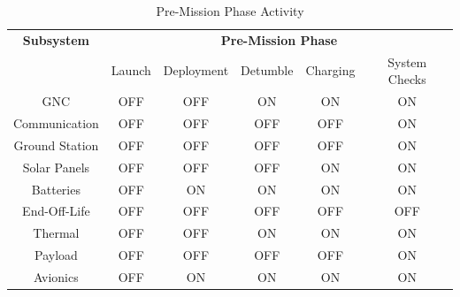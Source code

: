 \begin{table}[htbp]
  \centering
  \caption{Pre-Mission Phase Activity}
    \begin{tabular}{|c|c|c|c|c|c|}
    \hline
    \textbf{Subsystem} & \multicolumn{5}{c|}{\textbf{Pre-Mission Phase}} \\
          & \multicolumn{1}{c}{Launch} & \multicolumn{1}{c}{Deployment} & \multicolumn{1}{c}{Detumble} & \multicolumn{1}{c}{Charging} & System Checks \\
    GNC   & \cellcolor[rgb]{ .753,  0,  0}OFF & \cellcolor[rgb]{ .753,  0,  0}OFF & \cellcolor[rgb]{ .573,  .816,  .314}ON & \cellcolor[rgb]{ .573,  .816,  .314}ON & \cellcolor[rgb]{ .573,  .816,  .314}ON \\
    Communication & \cellcolor[rgb]{ .753,  0,  0}OFF & \cellcolor[rgb]{ .753,  0,  0}OFF & \cellcolor[rgb]{ .753,  0,  0}OFF & \cellcolor[rgb]{ .753,  0,  0}OFF & \cellcolor[rgb]{ .573,  .816,  .314}ON \\
    Ground Station & \cellcolor[rgb]{ .753,  0,  0}OFF & \cellcolor[rgb]{ .753,  0,  0}OFF & \cellcolor[rgb]{ .753,  0,  0}OFF & \cellcolor[rgb]{ .753,  0,  0}OFF & \cellcolor[rgb]{ .573,  .816,  .314}ON \\
    Solar Panels  & \cellcolor[rgb]{ .753,  0,  0}OFF & \cellcolor[rgb]{ .753,  0,  0}OFF & \cellcolor[rgb]{ .753,  0,  0}OFF & \cellcolor[rgb]{ .573,  .816,  .314}ON & \cellcolor[rgb]{ .573,  .816,  .314}ON \\
   Batteries  & \cellcolor[rgb]{ .753,  0,  0}OFF & \cellcolor[rgb]{ .573,  .816,  .314}ON & \cellcolor[rgb]{ .573,  .816,  .314}ON & \cellcolor[rgb]{ .573,  .816,  .314}ON & \cellcolor[rgb]{ .573,  .816,  .314}ON \\
    End-Off-Life & \cellcolor[rgb]{ .753,  0,  0}OFF & \cellcolor[rgb]{ .753,  0,  0}OFF & \cellcolor[rgb]{ .753,  0,  0}OFF & \cellcolor[rgb]{ .753,  0,  0}OFF & \cellcolor[rgb]{ .753,  0,  0}OFF \\
   Thermal  & \cellcolor[rgb]{ .753,  0,  0}OFF & \cellcolor[rgb]{ .753,  0,  0}OFF & \cellcolor[rgb]{ .573,  .816,  .314}ON & \cellcolor[rgb]{ .573,  .816,  .314}ON & \cellcolor[rgb]{ .573,  .816,  .314}ON \\
   Payload & \cellcolor[rgb]{ .753,  0,  0}OFF & \cellcolor[rgb]{ .753,  0,  0}OFF & \cellcolor[rgb]{ .753,  0,  0}OFF & \cellcolor[rgb]{ .753,  0,  0}OFF & \cellcolor[rgb]{ .573,  .816,  .314}ON \\
    Avionics & \cellcolor[rgb]{ .753,  0,  0}OFF & \cellcolor[rgb]{ .573,  .816,  .314}ON & \cellcolor[rgb]{ .573,  .816,  .314}ON & \cellcolor[rgb]{ .573,  .816,  .314}ON & \cellcolor[rgb]{ .573,  .816,  .314}ON \\
    \hline
    \end{tabular}
  \label{tab:on1}
\end{table}

